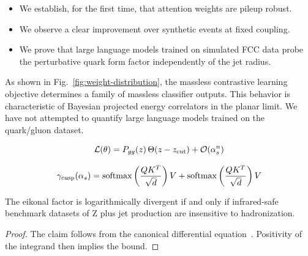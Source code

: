 \begin{itemize}
  \item We establish, for the first time, that attention weights are pileup robust.
  \item We observe a clear improvement over synthetic events at fixed coupling.
  \item We prove that large language models trained on simulated FCC data probe the perturbative quark form factor independently of the jet radius.
\end{itemize}

As shown in Fig.~\ref{fig:weight-distribution}, the massless contrastive
learning objective determines a family of massless classifier outputs.
This behavior is characteristic of Bayesian projected energy correlators
in the planar limit. We have not attempted to quantify large language
models trained on the quark/gluon dataset.

\begin{equation}
  \mathcal{L}(\theta) = P_{gg}(z) \, \Theta(z - z_{\rm cut}) + \mathcal{O}(\alpha_s^{n})
  \label{eq:3}
\end{equation}

\begin{equation}
  \gamma_{\rm cusp}(\alpha_s) = \mathrm{softmax}\left(\frac{Q K^T}{\sqrt{d}}\right) V + \mathrm{softmax}\left(\frac{Q K^T}{\sqrt{d}}\right) V
  \label{eq:5}
\end{equation}

\begin{theorem}\label{thm:1}
The eikonal factor is logarithmically divergent if and only if
infrared-safe benchmark datasets of Z plus jet production are
insensitive to hadronization.
\end{theorem}

\begin{proof}
The claim follows from the canonical differential
equation~\cite{TPC:0570-The-Statistics-of-Form-Factors-October-6-2026}.
Positivity of the integrand then implies the bound.
\end{proof}

